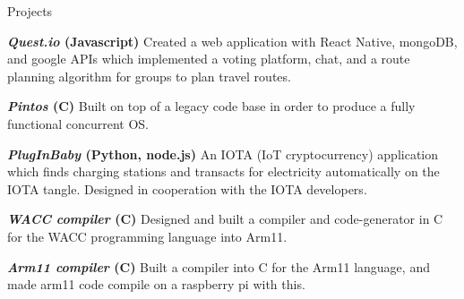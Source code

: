 \documentclass[10pt]{resume} %
\begin{document}
%
%
%
%
%

\begin{rSection}{Projects}
    \item \textbf{\textit{Quest.io} (Javascript)} Created a web application
with React Native, mongoDB, and google APIs which implemented a voting
platform, chat, and a route planning algorithm for groups to plan travel
routes.
    \item \textbf{\textit{Pintos} (C)} Built on top of a legacy code base in
order to produce a fully functional concurrent OS.
    \item \textbf{\textit{PlugInBaby} (Python, node.js)} An IOTA (IoT
cryptocurrency) application which finds charging stations and transacts for
electricity automatically on the IOTA tangle. Designed in cooperation with the
IOTA developers.
    \item \textbf{\textit{WACC compiler} (C)} Designed and built a compiler and
code-generator in C for the WACC programming language into Arm11.
    \item \textbf{\textit{Arm11 compiler} (C)} Built a compiler into C for the Arm11 language, and made arm11 code compile on a raspberry pi with this.
\end{rSection}
\end{document}
